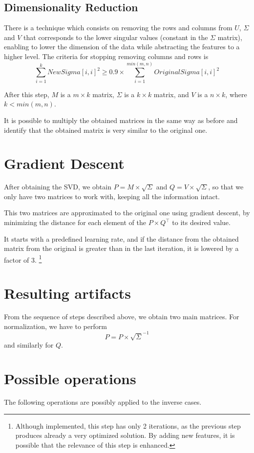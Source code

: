 \documentclass{llncs}
\begin{document}
\subsection{Dimensionality Reduction}
There is a technique which consists on removing the rows and columns from $U$, $\Sigma$ and $V$ that corresponds to the lower singular values (constant in the $\Sigma$ matrix), enabling to lower the dimension of the data while abstracting the features to a higher level. The criteria for stopping removing columns and rows is
$$\sum_{i=1}^{k} NewSigma[i,i]^2 \geq 0.9 \times \sum_{i=1}^{min(m, n)} OriginalSigma[i,i]^2$$

After this step, $M$ is a $m \times k$ matrix, $\Sigma$ is a $k \times k$ matrix, and $V$ is a $n \times k$, where $k < min(m, n)$.

It is possible to multiply the obtained matrices in the same way as before and identify that the obtained matrix is very similar to the original one.

\section{Gradient Descent}

After obtaining the SVD, we obtain $P = M \times \sqrt{\Sigma}$ and $Q = V \times \sqrt{\Sigma}$, so that we only have two matrices to work with, keeping all the information intact.

This two matrices are approximated to the original one using gradient descent, by minimizing the distance for each element of the $P \times Q^\top$ to its desired value.

It starts with a predefined learning rate, and if the distance from the obtained matrix from the original is greater than in the last iteration, it is lowered by a factor of 3.
\footnote{Although implemented, this step has only 2 iterations, as the previous step produces already a very optimized solution. By adding new features, it is possible that the relevance of this step is enhanced.}

\section{Resulting artifacts}
From the sequence of steps described above, we obtain two main matrices. For normalization, we have to perform
$$P = P \times \sqrt{\Sigma}^{-1}$$
and similarly for $Q$.

\section{Possible operations}
The following operations are possibly applied to the inverse cases.
\end{document}
